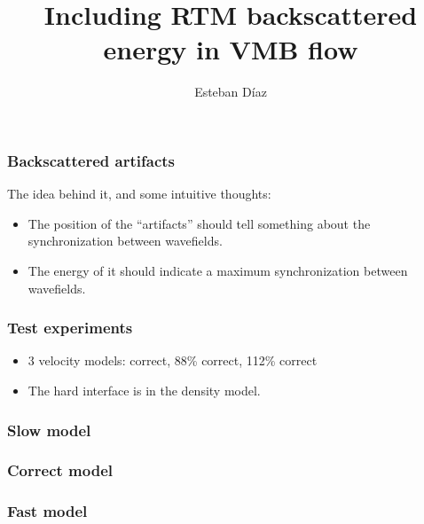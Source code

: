 

\title[]{Including RTM backscattered energy in VMB flow}
\subtitle{}
\author[]{Esteban  D\'{i}az}
\date{}
\logo{}

\def\big#1{\begin{center} \LARGE \textbf{#1} \end{center}}
\def\cen#1{\begin{center}        \textbf{#1} \end{center}}

 { \cwpcover }

\begin{frame} \frametitle{Backscattered artifacts}
The idea behind it, and some intuitive thoughts:

\begin{itemize}
   \item The position of the ``artifacts'' should tell 
   something about the synchronization between wavefields.
   \item The energy of it should indicate a maximum synchronization 
   between wavefields.
\end{itemize}

\end{frame}
\cwpnote{}

\begin{frame} \frametitle{Test experiments}

\begin{itemize}
   \item 3 velocity models: correct, 88\% correct, 112\% correct
   \item The hard interface is in the density model. 
\end{itemize}

\end{frame}
\cwpnote{}

\begin{frame} \frametitle{Slow    model}  \end{frame}
\begin{frame} \frametitle{Correct model}  \end{frame}
\begin{frame} \frametitle{Fast    model}  \end{frame}

